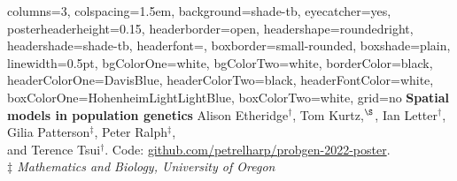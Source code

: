 \documentclass[fontscale=0.38,a0paper]{baposter}
\begin{document}
\newlength{\leftimgwidth}
\begin{poster}%
  {
  columns=3,
  colspacing=1.5em,
  background=shade-tb,
  eyecatcher=yes,
  posterheaderheight=0.15\textheight,
  headerborder=open,
  headershape=roundedright,
  headershade=shade-tb,
  headerfont=\Large\textsf, %
  boxborder=small-rounded,
  boxshade=plain,
  linewidth=0.5pt,
  bgColorOne=white,
  bgColorTwo=white,
  borderColor=black,
  headerColorOne=DavisBlue,
  headerColorTwo=black,
  headerFontColor=white,
  boxColorOne=HohenheimLightLightBlue,
  boxColorTwo=white,
  grid=no
  }
  {
  }
  {\sf %
  \vspace{0.5em}
     \textbf{\textcolor{DavisBlue}{Spatial models in population genetics}}\vspace{0.5em}}
  {\sf %
    Alison Etheridge${}^\dagger$,
    Tom Kurtz,${}^\S$,
    Ian Letter${}^\dagger$,
    Gilia Patterson$^{\ddagger}$,
    Peter Ralph$^{\ddagger}$,
    \\  \vspace{-1.0mm}
    and Terence Tsui${}^\dagger$.
Code: \url{github.com/petrelharp/probgen-2022-poster}. 
    \\  \vspace{-1.0mm}
    {\small \textit{$\ddagger$ Mathematics and Biology, University of Oregon} }\\ \vspace{-0.5em}
}
\end{poster}
\end{document}
